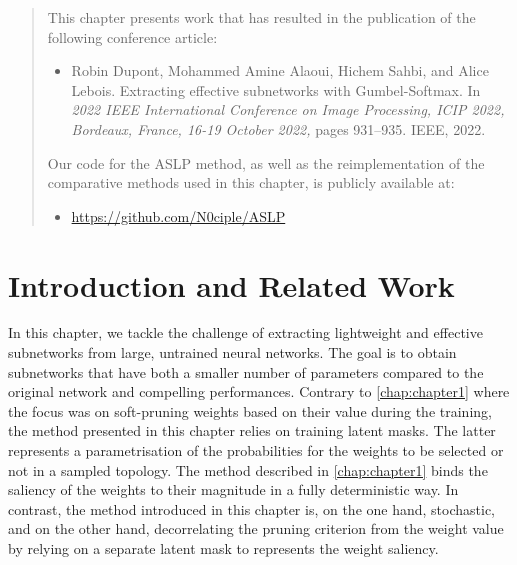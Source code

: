 \begin{abstract}
  \noindent This chapter presents work that has resulted in the publication of the
  following conference article:
  \begin{itemize}
    \item Robin Dupont, Mohammed Amine Alaoui, Hichem Sahbi, and Alice
          Lebois. Extracting effective subnetworks with Gumbel-Softmax. In \textit{2022
            IEEE International Conference on Image Processing, ICIP 2022, Bordeaux,
            France, 16-19 October 2022,} pages 931–935. IEEE, 2022.
  \end{itemize}

  \noindent Our code for the \ac{ASLP} method, as well as the reimplementation
  of the comparative methods used in this chapter, is publicly available at:
  \begin{itemize}
    \item \url{https://github.com/N0ciple/ASLP}
  \end{itemize}

\end{abstract}

\section{Introduction and Related Work}

In this chapter, we tackle the challenge of extracting lightweight and effective
subnetworks from large, untrained neural networks. The goal is to obtain
subnetworks that have both a smaller number of parameters compared to the
original network and compelling performances. Contrary to \cref{chap:chapter1}
where the focus was on soft-pruning weights based on their value during the
training, the method presented in this chapter relies on training latent masks.
The latter represents a parametrisation of the probabilities for the weights to
be selected or not in a sampled topology. The method described in
\cref{chap:chapter1} binds the saliency of the weights to their magnitude in a
fully deterministic way. In contrast, the method introduced in this chapter is,
on the one hand, stochastic, and on the other hand, decorrelating the pruning
criterion from the weight value by relying on a separate latent mask to
represents the weight saliency.\\

